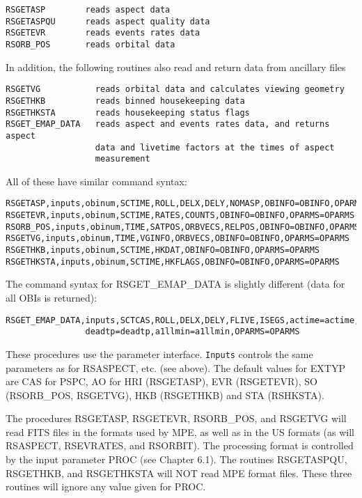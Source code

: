\medskip\noindent
\begin{verbatim}
RSGETASP        reads aspect data
RSGETASPQU      reads aspect quality data
RSGETEVR        reads events rates data
RSORB_POS       reads orbital data
\end{verbatim}
In addition, the following routines also read and return data from ancillary
files

\medskip\noindent
\begin{verbatim}
RSGETVG           reads orbital data and calculates viewing geometry
RSGETHKB          reads binned housekeeping data
RSGETHKSTA        reads housekeeping status flags
RSGET_EMAP_DATA   reads aspect and events rates data, and returns aspect
                  data and livetime factors at the times of aspect
                  measurement
\end{verbatim}
All of these have similar command syntax:

\medskip\noindent
\begin{verbatim}
RSGETASP,inputs,obinum,SCTIME,ROLL,DELX,DELY,NOMASP,OBINFO=OBINFO,OPARMS=OPARMS
RSGETEVR,inputs,obinum,SCTIME,RATES,COUNTS,OBINFO=OBINFO,OPARMS=OPARMS
RSORB_POS,inputs,obinum,TIME,SATPOS,ORBVECS,RELPOS,OBINFO=OBINFO,OPARMS=OPARMS
RSGETVG,inputs,obinum,TIME,VGINFO,ORBVECS,OBINFO=OBINFO,OPARMS=OPARMS
RSGETHKB,inputs,obinum,SCTIME,HKDAT,OBINFO=OBINFO,OPARMS=OPARMS
RSGETHKSTA,inputs,obinum,SCTIME,HKFLAGS,OBINFO=OBINFO,OPARMS=OPARMS
\end{verbatim}
The command syntax for RSGET{\_}EMAP{\_}DATA is slightly different (data for all
OBIs is returned):

\medskip\noindent
\begin{verbatim}
RSGET_EMAP_DATA,inputs,SCTCAS,ROLL,DELX,DELY,FLIVE,ISEGS,actime=actime,$
                deadtp=deadtp,a1llmin=a1llmin,OPARMS=OPARMS
\end{verbatim}
These procedures use the parameter interface. {\tt Inputs} controls the same
parameters as for RSASPECT, etc. (see above). The default values for EXTYP are
CAS for PSPC, AO for HRI (RSGETASP), EVR (RSGETEVR), SO (RSORB{\_}POS, RSGETVG),
HKB (RSGETHKB) and STA (RSHKSTA).
 
The procedures RSGETASP, RSGETEVR, RSORB{\_}POS, and RSGETVG will read FITS
files in the formats used by MPE, as well as in the US formats (as will
RSASPECT, RSEVRATES, and RSORBIT). The processing format is controlled by
the input parameter PROC (see Chapter 6.1). The routines RSGETASPQU,
RSGETHKB, and RSGETHKSTA will NOT read MPE format files. These three
routines will ignore any value given for PROC.
 
